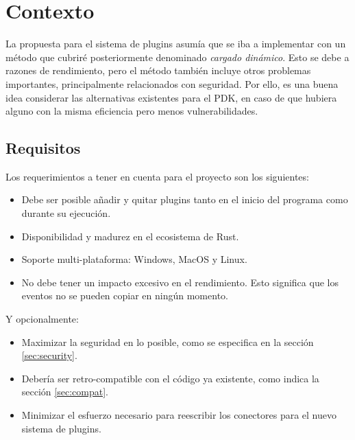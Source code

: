 
\chapter{Contexto}\label{sec:investigation}

La propuesta para el sistema de plugins asumía que se iba a implementar con un
método que cubriré posteriormente denominado \emph{cargado dinámico}. Esto se
debe a razones de rendimiento, pero el método también incluye otros problemas
importantes, principalmente relacionados con seguridad. Por ello, es una buena
idea considerar las alternativas existentes para el PDK, en caso de que hubiera
alguno con la misma eficiencia pero menos vulnerabilidades.

\section{Requisitos}

Los requerimientos a tener en cuenta para el proyecto son los siguientes:

\begin{itemize}
    \item Debe ser posible añadir y quitar plugins tanto en el inicio del
        programa como durante su ejecución.

    \item Disponibilidad y madurez en el ecosistema de Rust.

    \item Soporte multi-plataforma: Windows, MacOS y Linux.

    \item No debe tener un impacto excesivo en el rendimiento. Esto significa
        que los eventos no se pueden copiar en ningún momento.

\end{itemize}

Y opcionalmente:

\begin{itemize}
    \item Maximizar la seguridad en lo posible, como se especifica en la sección
        \ref{sec:security}.

    \item Debería ser retro-compatible con el código ya existente, como indica la
        sección \ref{sec:compat}.

    \item Minimizar el esfuerzo necesario para reescribir los conectores para el
        nuevo sistema de plugins.

\end{itemize}

